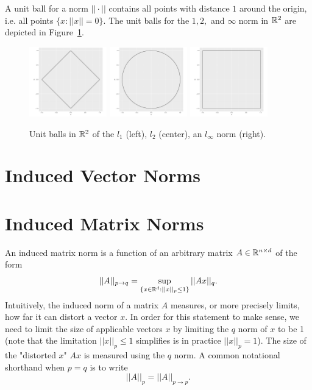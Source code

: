 \documentclass{article}
\begin{document}
A unit ball for a norm $||\cdot||$ contains all points with distance $1$ around the origin, i.e. all points $\{x: ||x|| = 0\}$. The unit balls for the $1, 2,$ and $\infty$ norm in $\mathbb{R}^2$ are depicted in Figure~\ref{fig:input}.
\begin{figure}[ht]
    \centering
    \includegraphics[width=0.3\textwidth]{unit_circle_1.pdf}
    \includegraphics[width=0.3\textwidth]{unit_circle_2.pdf}
    \includegraphics[width=0.3\textwidth]{unit_circle_inf.pdf}
    \caption{Unit balls in $\mathbb{R}^2$ of the $l_1$ (left), $l_2$ (center), an $l_\infty$ norm (right).}
    \label{fig:input}
\end{figure}


\section{Induced Vector Norms}



\section{Induced Matrix Norms}
An induced matrix norm is a function of an arbitrary matrix $A \in \mathbb{R}^{n \times d}$ of the form
$$||A||_{p \to q} = \sup_{\{x \in \mathbb{R}^d: ||x||_p \leq 1\}} ||Ax||_q.$$
Intuitively, the induced norm of a matrix $A$ measures, or more precisely limits, how far it can distort a vector $x$.
In order for this statement to make sense, we need to limit the size of applicable vectors $x$ by limiting the $q$ norm of $x$ to be 1 (note that the limitation $||x||_p \leq 1$ simplifies is in practice $||x||_p = 1$). 
The size of the "distorted $x$" $Ax$ is measured using the $q$ norm.
A common notational shorthand when $p = q$ is to write
$$||A||_p = ||A||_{p \to p}.$$
\end{document}
